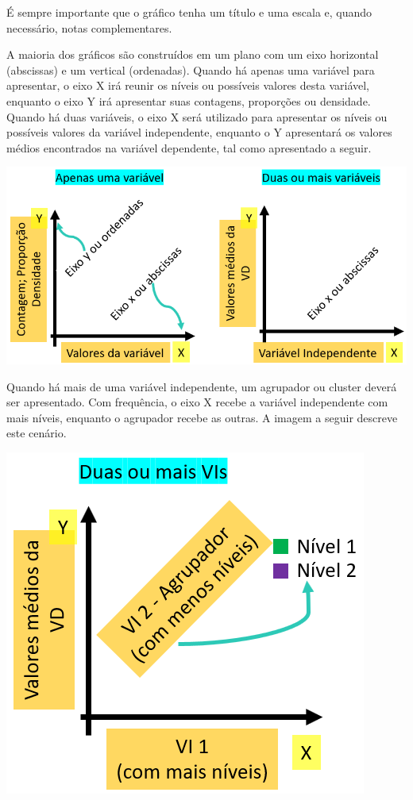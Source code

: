 \documentclass[
]{book}
\begin{document}
É sempre importante que o gráfico tenha um título e uma escala e, quando
necessário, notas complementares.

A maioria dos gráficos são construídos em um plano com um eixo
horizontal (abscissas) e um vertical (ordenadas). Quando há apenas uma
variável para apresentar, o eixo X irá reunir os níveis ou possíveis
valores desta variável, enquanto o eixo Y irá apresentar suas contagens,
proporções ou densidade. Quando há duas variáveis, o eixo X será
utilizado para apresentar os níveis ou possíveis valores da variável
independente, enquanto o Y apresentará os valores médios encontrados na
variável dependente, tal como apresentado a seguir.

\includegraphics{./img/cap_grafico_tutorial.png}

Quando há mais de uma variável independente, um agrupador ou cluster
deverá ser apresentado. Com frequência, o eixo X recebe a variável
independente com mais níveis, enquanto o agrupador recebe as outras. A
imagem a seguir descreve este cenário.

\includegraphics{./img/cap_grafico_tutorial2.png}
\end{document}
